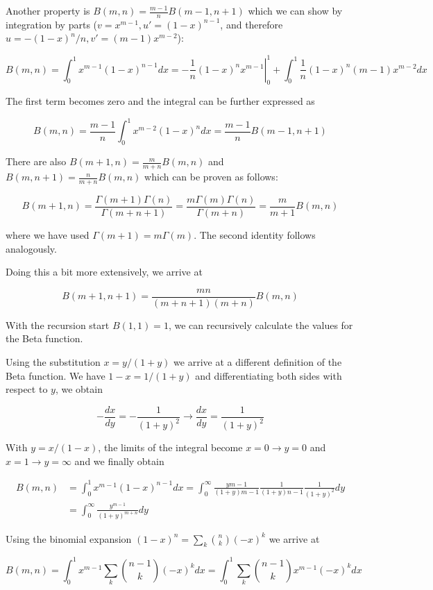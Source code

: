 Another property is \(B(m,n) = \frac{m-1}{n} B(m-1, n+1)\) which we can
show by integration by parts ($v = x^{m-1}, u' = (1-x)^{n-1}$, and therefore $u = -(1-x)^n/n, v' = (m-1)x^{m-2}$):

\[
B(m,n) = \int_0^1 x^{m-1} (1-x)^{n-1} dx = \left. - \frac{1}{n} (1-x)^n x^{m-1} \right|_0^1 + \int_0^1 \frac{1}{n} (1-x)^n (m-1) x^{m-2} dx
\]

The first term becomes zero and the integral can be further expressed as

\[
B(m,n) = \frac{m-1}{n} \int_0^1 x^{m-2} (1-x)^n dx = \frac{m-1}{n} B(m-1, n+1)
\]

There are also \(B(m+1,n)= \frac{m}{m+n}B(m,n)\) and
\(B(m,n+1)=\frac{n}{m+n}B(m,n)\) which can be proven as follows:

\[
B(m+1,n) = \frac{\Gamma(m+1)\Gamma(n)}{\Gamma(m+n+1)} = \frac{m \Gamma(m)\Gamma(n)}{\Gamma(m+n)} = \frac{m}{m+1}B(m,n)
\]

where we have used \(\Gamma(m+1) = m \Gamma(m)\). The second identity
follows analogously.

Doing this a bit more extensively, we arrive at

\[
B(m+1,n+1) = \frac{mn}{(m+n+1)(m+n)}B(m,n)
\]

With the recursion start \(B(1,1) = 1\), we can recursively calculate
the values for the Beta function.

Using the substitution \(x = y/(1+y)\) we arrive at a different
definition of the Beta function. We have \(1 - x = 1/(1+y)\) and
differentiating both sides with respect to \(y\), we obtain

\[
-\frac{dx}{dy} = -\frac{1}{(1+y)^2} \rightarrow \frac{dx}{dy} = \frac{1}{(1+y)^2}
\]

With \(y = x/(1-x)\), the limits of the integral become
\(x=0 \rightarrow y=0\) and \(x=1 \rightarrow y=\infty\) and we finally
obtain

\begin{align*}
  B(m,n) &= \int_0^1 x^{m-1} (1-x)^{n-1} dx = \int_0^\infty \frac{y{m-1}}{(1+y){m-1}} \frac{1}{(1+y){n-1}} \frac{1}{(1+y)^2} dy\\
  &= \int_0^\infty \frac{y^{m-1}}{(1+y)^{m+n}} dy
\end{align*}

Using the binomial expansion \((1-x)^n = \sum_k {n \choose k} (-x)^k\)
we arrive at

\[
B(m,n) = \int_0^1 x^{m-1} \sum_k {n-1 \choose k} (-x)^k dx = \int_0^1 \sum_k {n-1 \choose k} x^{m-1} (-x)^k dx
\]

